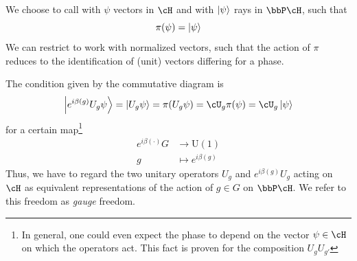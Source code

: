 \documentclass[11pt]{article}
\theoremstyle{definition}
\numberwithin{equation}{section}
\newcommand*\U{\mathrm{U}}
\begin{document}
We choose to call with $\psi$ vectors in $\cH$ and with $\ket{\psi}$ rays in $\bbP \cH$, such that
\begin{equation}
    \pi ( \psi) = \ket{\psi}
\end{equation}
We can restrict to work with normalized vectors, such that the action of $\pi$ reduces to the identification of (unit) vectors differing for a phase.
 
The condition given by the commutative diagram is
\begin{equation}
	\ket{ e^{i \beta(g)} U_g \psi } = \ket{U_{g} \psi} = \pi ( U_g \psi )  = \cU_g \pi (\psi) =   \cU_g  \ket{\psi} 
\end{equation}
for a certain map\footnote{In general, one could even expect the phase to depend on the vector $\psi \in \cH$ on which the operators act. This fact is proven for the composition $U_g U_{g'}$ }
\begin{equation}
    \begin{aligned}
        e^{i \beta(\cdot)}  G &\to \U(1)\\
        g &\mapsto e^{i \beta(g)}
    \end{aligned}
\end{equation}
Thus, we have to regard the two unitary operators $U_g$ and $e^{i \beta(g)} U_g$ acting on $\cH$ as equivalent representations of the action of $g \in G$ on $\bbP\cH$. We refer to this freedom as \textit{gauge} freedom. 
\end{document}
